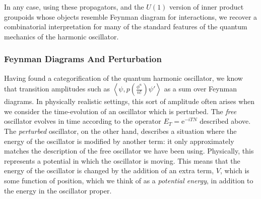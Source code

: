 \documentclass{amsart} \usepackage{amsmath,amssymb,bbm}
\newcommand{\inprod}[1]{\left\langle{#1}\right\rangle}
\newcommand{\mathe}{\mathrm{e}}
\begin{document}
In any case, using these propagators, and the $U(1)$ version of inner
product groupoids whose objects resemble Feynman diagram for
interactions, we recover a combinatorial interpretation for many of
the standard features of the quantum mechanics of the harmonic
oscillator.

\subsubsection{Feynman Diagrams And Perturbation}

Having found a categorification of the quantum harmonic oscillator, we
know that transition amplitudes such as
$\inprod{\psi,p(\frac{\phi^n}{n!})\psi '}$ as a sum over Feynman
diagrams.  In physically realistic settings, this sort of amplitude
often arises when we consider the time-evolution of an oscillator
which is perturbed.  The \textit{free} oscillator evolves in time
according to the operator $E_T=\mathe^{-iTN}$ described above.  The
\textit{perturbed} oscillator, on the other hand, describes a
situation where the energy of the oscillator is modified by another
term: it only approximately matches the description of the free
oscillator we have been using.  Physically, this represents a
potential in which the oscillator is moving.  This means that the
energy of the oscillator is changed by the addition of an extra term,
$V$, which is some function of position, which we think of as a
\textit{potential energy}, in addition to the energy in the oscillator
proper.
\end{document}
